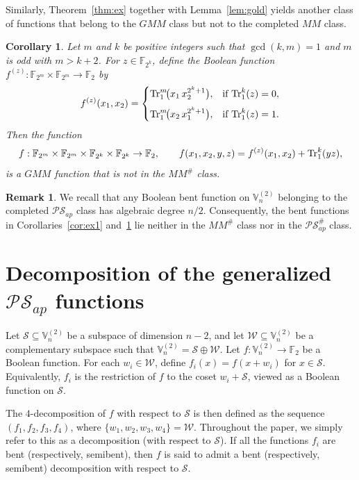 \documentclass[12pt]{article}
\theoremstyle{plain}
\newtheorem{corollary}[lemma]{Corollary}
\theoremstyle{definition}
\newtheorem{remark}{Remark}
\newcommand{\V}{\mathbb{V}}
\renewcommand{\to}{\rightarrow}
\newcommand{\Tr}{{\rm Tr}}
\begin{document}
	Similarly, Theorem~\ref{thm:ex} together with Lemma~\ref{lem:gold} yields another
	class of functions that belong to the \(GMM\) class but not to the completed
	\(MM\) class.
	
	
	\begin{corollary}\label{cor:ex2}
		Let $m$ and $k$ be positive integers such that $\gcd(k,m)=1$ and $m$ is odd with \(m > k+2\).
		For $z\in\mathbb{F}_{2^k}$, define the Boolean function
		$f^{(z)}:\mathbb{F}_{2^m}\times\mathbb{F}_{2^m}\to\mathbb{F}_{2}$ by
		\[
		f^{(z)}(x_1,x_2)=
		\begin{cases}
		\Tr_1^m\!\bigl(x_1\,x_2^{2^k+1}\bigr), & \text{if } \Tr_1^k(z)=0, \\[6pt]
		\Tr_1^m\!\bigl(x_2\,x_1^{2^k+1}\bigr), & \text{if } \Tr_1^k(z)=1.
		\end{cases}
		\]
		Then the function
		\[
		f:\mathbb{F}_{2^m}\times\mathbb{F}_{2^m}\times
		\mathbb{F}_{2^k}\times\mathbb{F}_{2^k}\to\mathbb{F}_{2},
		\qquad
		f(x_1,x_2,y,z)=f^{(z)}(x_1,x_2)+\Tr_1^k(yz),
		\]
		is a \(GMM\) function that is not in the \(MM^{\#}\) class.
	\end{corollary}
	
	\begin{remark}
		We recall that any Boolean bent function on $\V_n^{(2)}$ belonging to the completed $\mathcal{PS}_{ap}$ class has algebraic degree $n/2$. Consequently, the bent functions in Corollaries~\ref{cor:ex1} and~\ref{cor:ex2} lie neither in the \(MM^{\#}\) class nor in the $\mathcal{PS}_{ap}^{\#}$ class.
	\end{remark}
	
	
	\section{Decomposition of the generalized $\mathcal{PS}_{ap}$ functions } \label{sec:decom}
	
	Let $\mathcal{S} \subseteq \V_n^{(2)}$ be a subspace of dimension $n-2$, and
	let $\mathcal{W} \subseteq \V_n^{(2)}$ be a complementary subspace such that $\V_n^{(2)} = \mathcal{S} \oplus \mathcal{W}$.
	Let $f \colon \V_n^{(2)} \to \mathbb{F}_2$ be a Boolean function.
	For each $w_i \in \mathcal{W}$, define $f_i(x) = f(x + w_i)$ for $x \in \mathcal{S}$.
	Equivalently, $f_i$ is the restriction of $f$ to the coset
	$w_i + \mathcal{S}$, viewed as a Boolean function on $\mathcal{S}$.
	
	The $4$-decomposition of $f$ with respect to $\mathcal{S}$ is then defined as the
	sequence $(f_1,f_2,f_3,f_4)$,
	where $\{w_1,w_2,w_3,w_4\} = \mathcal{W}$. Throughout the paper, we simply refer to this as a decomposition (with
	respect to $\mathcal{S}$).
	If all the functions $f_i$ are bent (respectively, semibent), then $f$
	is said to admit a bent (respectively, semibent) decomposition with
	respect to $\mathcal{S}$. 
	
\end{document}
